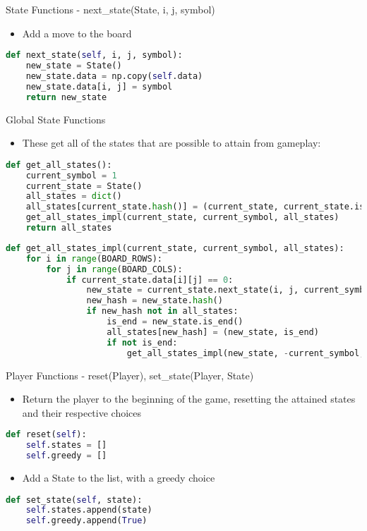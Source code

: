 \documentclass{beamer}
\begin{document}
  \begin{frame}[fragile]{State Functions - next\_state(State, i, j, symbol)}
  	\begin{itemize}
  		\item Add a move to the board
  	\end{itemize}
  	\begin{lstlisting}[language=Python]
def next_state(self, i, j, symbol):
    new_state = State()
    new_state.data = np.copy(self.data)
    new_state.data[i, j] = symbol
    return new_state	
 \end{lstlisting}
  \end{frame}

\begin{frame}[fragile]{Global State Functions}
	\begin{itemize}
		\item These get all of the states that are possible to attain from gameplay:
	\end{itemize}
\begin{lstlisting}[language=Python]
def get_all_states():
    current_symbol = 1
    current_state = State()
    all_states = dict()
    all_states[current_state.hash()] = (current_state, current_state.is_end())
    get_all_states_impl(current_state, current_symbol, all_states)
    return all_states
\end{lstlisting}
\begin{lstlisting}[language=Python]
def get_all_states_impl(current_state, current_symbol, all_states):
    for i in range(BOARD_ROWS):
        for j in range(BOARD_COLS):
            if current_state.data[i][j] == 0:
                new_state = current_state.next_state(i, j, current_symbol)
                new_hash = new_state.hash()
                if new_hash not in all_states:
                    is_end = new_state.is_end()
                    all_states[new_hash] = (new_state, is_end)
                    if not is_end:
                        get_all_states_impl(new_state, -current_symbol, all_states)
\end{lstlisting}
\end{frame}
\begin{frame}[fragile]{Player Functions - reset(Player), set\_state(Player, State)}
\begin{itemize}
	\item Return the player to the beginning of the game, resetting the attained states and their respective choices
\end{itemize}
\begin{lstlisting}[language=Python]
def reset(self):
    self.states = []
    self.greedy = []
\end{lstlisting}
\begin{itemize}
	\item Add a State to the list, with a greedy choice
\end{itemize}
\begin{lstlisting}[language=Python]
def set_state(self, state):
    self.states.append(state)
    self.greedy.append(True)
\end{lstlisting}
\end{frame}
\end{document}
